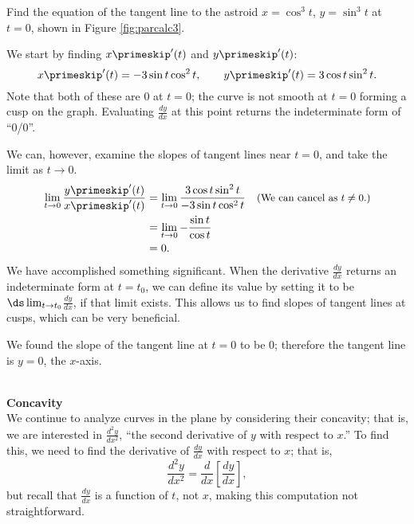 {Find the equation of the tangent line to the astroid $x=\cos^3 t$, $y=\sin^3t$ at $t=0$, shown in Figure \ref{fig:parcalc3}.
}
{We start by finding $x\primeskip'(t)$ and $y\primeskip'(t)$:
$$ x\primeskip'(t) = -3\sin t\cos^2t, \qquad y\primeskip'(t) = 3\cos t\sin^2t.$$
Note that both of these are 0 at $t=0$; the curve is not smooth at $t=0$ forming a cusp on the graph. Evaluating $\frac{dy}{dx}$ at this point returns the indeterminate form of ``0/0''. 

We can, however, examine the slopes of tangent lines near $t=0$, and take the limit as $t\to 0$. 
\begin{align*}
\lim_{t\to0} \frac{y\primeskip'(t)}{x\primeskip'(t)} &=\lim_{t\to0} \frac{3\cos t\sin^2t}{-3\sin t\cos^2t} \quad \text{\small (We can cancel as $t\neq 0$.)}\\
					&= \lim_{t\to0} -\frac{\sin t}{\cos t}\\
					&= 0.
\end{align*}
We have accomplished something significant. When the derivative $\frac{dy}{dx}$ returns an indeterminate form at $t=t_0$, we can define its value by setting it to be $\ds \lim_{t\to t_0} $$\frac{dy}{dx}$, if that limit exists. This allows us to find slopes of tangent lines at cusps, which can be very beneficial. 

We found the slope of the tangent line at $t=0$ to be 0; therefore the tangent line is $y=0$, the $x$-axis. 
}\\

\noindent\textbf{\large Concavity}\\

We continue to analyze curves in the plane by considering their concavity; that is, we are interested in $\frac{d^2y}{dx^2}$, ``the second derivative of $y$ with respect to $x$.'' To find this, we need to find the derivative of $\frac{dy}{dx}$ with respect to $x$; that is,  $$\frac{d^2y}{dx^2}=\frac{d}{dx}\left[\frac{dy}{dx}\right],$$ but recall that $\frac{dy}{dx}$ is a function of $t$, not $x$, making this computation not straightforward. 

